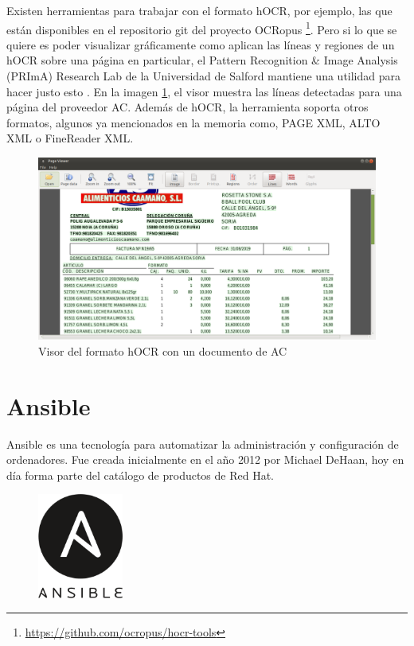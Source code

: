 Existen herramientas para trabajar con el formato hOCR, por ejemplo, las que están disponibles en el repositorio git del proyecto OCRopus \footnote{\url{https://github.com/ocropus/hocr-tools}}. Pero si lo que se quiere es poder visualizar gráficamente como aplican las líneas y regiones de un hOCR sobre una página en particular, el Pattern Recognition \& Image Analysis (PRImA) Research Lab de la Universidad de Salford mantiene una utilidad para hacer justo esto \cite{prima_tool_page_viewer}. En la imagen \ref{fig:visor-formato-hocr}, el visor muestra las líneas detectadas para una página del proveedor AC. Además de hOCR, la herramienta soporta otros formatos, algunos ya mencionados en la memoria como, PAGE XML, ALTO XML o FineReader XML.

\begin{figure}[hp!]
    \centering
    \includegraphics[width=1.0\textwidth]{imaxes/z-adicional/visor-hocr.png}
    \caption{Visor del formato hOCR con un documento de AC}
    \label{fig:visor-formato-hocr}
\end{figure}

\section{Ansible}


Ansible es una tecnología para automatizar la administración y configuración de ordenadores. Fue creada inicialmente en el año 2012 por Michael DeHaan, hoy en día forma parte del catálogo de productos de Red Hat.

\begin{figure}
    \centering
    \includegraphics[width=0.25\textwidth]{imaxes/e-fundamentos-tecnologicos/logo-ansible.png}
\end{figure}

